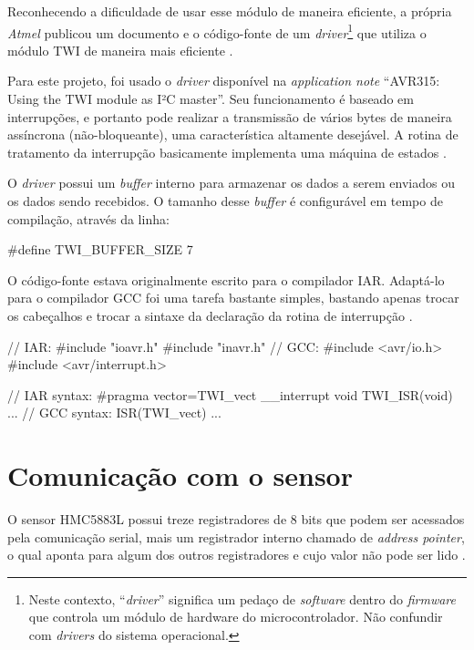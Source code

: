 \documentclass[brazil,pagestart=firstchapter]{abnt}
\begin{document}
Reconhecendo a dificuldade de usar esse módulo de maneira eficiente, a
própria \textit{Atmel} publicou um documento e o código-fonte de um
\textit{driver}\footnote{
	Neste contexto, ``\textit{driver}'' significa um pedaço de
	\textit{software} dentro do \textit{firmware} que controla um módulo de
	hardware do microcontrolador. Não confundir com \textit{drivers} do
	sistema operacional.}
que utiliza o módulo \ac{TWI} de maneira mais eficiente \cite{AVR315}.

Para este projeto, foi usado o \textit{driver} disponível na
\textit{application note} ``AVR315: Using the TWI module as I²C master''.
Seu funcionamento é baseado em interrupções, e portanto pode realizar a
transmissão de vários bytes de maneira assíncrona (não-bloqueante), uma
característica altamente desejável. A rotina de tratamento da interrupção
basicamente implementa uma máquina de estados \cite{AVR315}.

O \textit{driver} possui um \textit{buffer} interno para armazenar os dados
a serem enviados ou os dados sendo recebidos. O tamanho desse
\textit{buffer} é configurável em tempo de compilação, através da linha:

\begin{ccode}[numbers=none]
#define TWI_BUFFER_SIZE     7
\end{ccode}

O código-fonte estava originalmente escrito para o compilador IAR. Adaptá-lo
para o compilador GCC foi uma tarefa bastante simples, bastando apenas
trocar os cabeçalhos e trocar a sintaxe da declaração da rotina de
interrupção \cite{avrlibcporting}.

\begin{ccode}[numbers=none, multicols=2, float=h]
// IAR:
#include "ioavr.h"
#include "inavr.h"
// GCC:
#include <avr/io.h>
#include <avr/interrupt.h>
\end{ccode}

\begin{ccode}[numbers=none, multicols=2, float=h]
// IAR syntax:
#pragma vector=TWI_vect
__interrupt void TWI_ISR(void)
{
  ...
}
// GCC syntax:
ISR(TWI_vect)
{
  ...
}

\end{ccode}


\section{Comunicação com o sensor}
\label{sec:software_sensor}

O sensor HMC5883L possui treze registradores de 8 bits que podem ser
acessados pela comunicação serial, mais um registrador interno
chamado de \textit{address pointer}, o qual aponta para algum dos outros
registradores e cujo valor não pode ser lido \cite{HMC5883L}.
\end{document}
